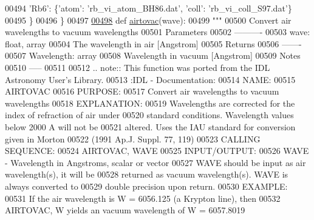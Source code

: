 \begin{DoxyCode}
00494                              \textcolor{stringliteral}{'Rb6'}: \{\textcolor{stringliteral}{'atom'}: \textcolor{stringliteral}{'rb\_vi\_atom\_BH86.dat'}, \textcolor{stringliteral}{'coll'}: \textcolor{stringliteral}{'rb\_vi\_coll\_S97.dat'}\}
00495                              \}
00496                            \} 
00497 
\hypertarget{physics_8py_source_l00498}{}\hyperlink{namespacepyneb_1_1utils_1_1physics_a75304d89e533b2199decec697f90c9a4}{00498} \textcolor{keyword}{def }\hyperlink{namespacepyneb_1_1utils_1_1physics_a75304d89e533b2199decec697f90c9a4}{airtovac}(wave):
00499     \textcolor{stringliteral}{"""}
00500 \textcolor{stringliteral}{Convert air wavelengths to vacuum wavelengths}
00501 \textcolor{stringliteral}{Parameters}
00502 \textcolor{stringliteral}{----------}
00503 \textcolor{stringliteral}{wave: float, array}
00504 \textcolor{stringliteral}{The wavelength in air [Angstrom]}
00505 \textcolor{stringliteral}{Returns}
00506 \textcolor{stringliteral}{-------}
00507 \textcolor{stringliteral}{Wavelength: array}
00508 \textcolor{stringliteral}{Wavelength in vacuum [Angstrom]}
00509 \textcolor{stringliteral}{Notes}
00510 \textcolor{stringliteral}{-----}
00511 \textcolor{stringliteral}{}
00512 \textcolor{stringliteral}{.. note:: This function was ported from the IDL Astronomy User's Library.}
00513 \textcolor{stringliteral}{:IDL - Documentation:}
00514 \textcolor{stringliteral}{NAME:}
00515 \textcolor{stringliteral}{AIRTOVAC}
00516 \textcolor{stringliteral}{PURPOSE:}
00517 \textcolor{stringliteral}{Convert air wavelengths to vacuum wavelengths}
00518 \textcolor{stringliteral}{EXPLANATION:}
00519 \textcolor{stringliteral}{Wavelengths are corrected for the index of refraction of air under}
00520 \textcolor{stringliteral}{standard conditions. Wavelength values below 2000 A will not be}
00521 \textcolor{stringliteral}{altered. Uses the IAU standard for conversion given in Morton}
00522 \textcolor{stringliteral}{(1991 Ap.J. Suppl. 77, 119)}
00523 \textcolor{stringliteral}{CALLING SEQUENCE:}
00524 \textcolor{stringliteral}{AIRTOVAC, WAVE}
00525 \textcolor{stringliteral}{INPUT/OUTPUT:}
00526 \textcolor{stringliteral}{WAVE - Wavelength in Angstroms, scalar or vector}
00527 \textcolor{stringliteral}{WAVE should be input as air wavelength(s), it will be}
00528 \textcolor{stringliteral}{returned as vacuum wavelength(s). WAVE is always converted to}
00529 \textcolor{stringliteral}{double precision upon return.}
00530 \textcolor{stringliteral}{EXAMPLE:}
00531 \textcolor{stringliteral}{If the air wavelength is W = 6056.125 (a Krypton line), then}
00532 \textcolor{stringliteral}{AIRTOVAC, W yields an vacuum wavelength of W = 6057.8019}

\end{DoxyCode}
